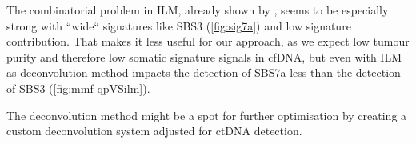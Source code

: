 The combinatorial problem in ILM, already shown by \textcite{Lynch2016}, seems to be especially strong with ``wide`` signatures like SBS3 (\autoref{fig:sig7a}) and low signature contribution. That makes it less useful for our approach, as we expect low tumour purity and therefore low somatic signature signals in cfDNA, but even with ILM as deconvolution method impacts the detection of SBS7a less than the detection of SBS3 (\autoref{fig:mmf-qpVSilm}).

The deconvolution method might be a spot for further optimisation by creating a custom deconvolution system adjusted for ctDNA detection.

